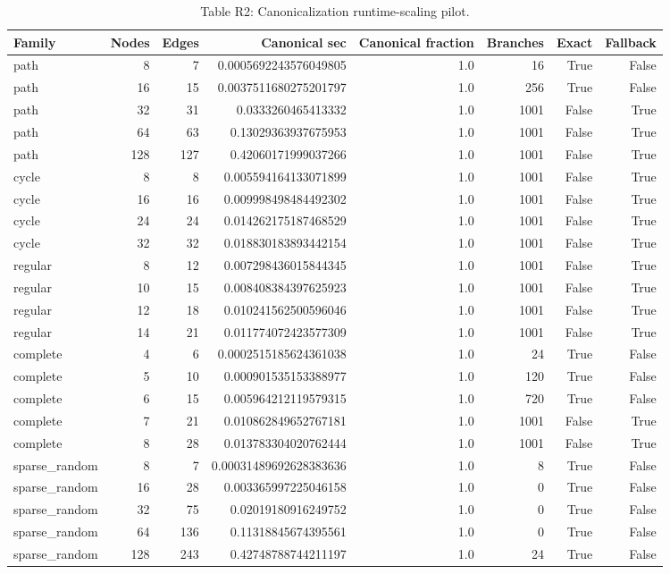 \begin{table}[t]
\centering
\caption{Table R2: Canonicalization runtime-scaling pilot.}
\begin{tabular}{lrrrrrrr}
\toprule
Family & Nodes & Edges & Canonical sec & Canonical fraction & Branches & Exact & Fallback \\
\midrule
path & 8 & 7 & 0.0005692243576049805 & 1.0 & 16 & True & False \\
path & 16 & 15 & 0.0037511680275201797 & 1.0 & 256 & True & False \\
path & 32 & 31 & 0.0333260465413332 & 1.0 & 1001 & False & True \\
path & 64 & 63 & 0.13029363937675953 & 1.0 & 1001 & False & True \\
path & 128 & 127 & 0.42060171999037266 & 1.0 & 1001 & False & True \\
cycle & 8 & 8 & 0.005594164133071899 & 1.0 & 1001 & False & True \\
cycle & 16 & 16 & 0.009998498484492302 & 1.0 & 1001 & False & True \\
cycle & 24 & 24 & 0.014262175187468529 & 1.0 & 1001 & False & True \\
cycle & 32 & 32 & 0.018830183893442154 & 1.0 & 1001 & False & True \\
regular & 8 & 12 & 0.007298436015844345 & 1.0 & 1001 & False & True \\
regular & 10 & 15 & 0.008408384397625923 & 1.0 & 1001 & False & True \\
regular & 12 & 18 & 0.010241562500596046 & 1.0 & 1001 & False & True \\
regular & 14 & 21 & 0.011774072423577309 & 1.0 & 1001 & False & True \\
complete & 4 & 6 & 0.0002515185624361038 & 1.0 & 24 & True & False \\
complete & 5 & 10 & 0.000901535153388977 & 1.0 & 120 & True & False \\
complete & 6 & 15 & 0.005964212119579315 & 1.0 & 720 & True & False \\
complete & 7 & 21 & 0.010862849652767181 & 1.0 & 1001 & False & True \\
complete & 8 & 28 & 0.013783304020762444 & 1.0 & 1001 & False & True \\
sparse\_random & 8 & 7 & 0.00031489692628383636 & 1.0 & 8 & True & False \\
sparse\_random & 16 & 28 & 0.003365997225046158 & 1.0 & 0 & True & False \\
sparse\_random & 32 & 75 & 0.02019180916249752 & 1.0 & 0 & True & False \\
sparse\_random & 64 & 136 & 0.11318845674395561 & 1.0 & 0 & True & False \\
sparse\_random & 128 & 243 & 0.42748788744211197 & 1.0 & 24 & True & False \\
\bottomrule
\end{tabular}
\end{table}
